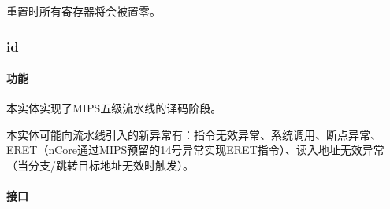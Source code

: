 \documentclass{article}
\begin{document}
\begin{spacing}{1.4}
重置时所有寄存器将会被置零。

\subsubsection{id}

\paragraph{功能}\mbox{}

本实体实现了MIPS五级流水线的译码阶段。

本实体可能向流水线引入的新异常有：指令无效异常、系统调用、断点异常、ERET（nCore通过MIPS预留的14号异常实现ERET指令）、读入地址无效异常（当分支/跳转目标地址无效时触发）。

\paragraph{接口}\mbox{}


\end{spacing}
\end{document}
